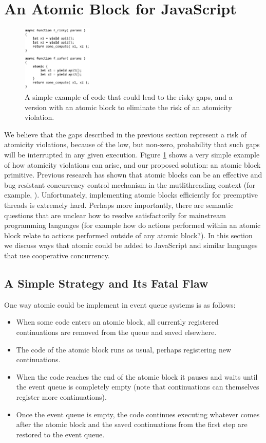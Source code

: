 \documentclass[sigplan,10pt,review,anonymous]{acmart}\settopmatter{printfolios=true,printccs=false,printacmref=false}
\begin{document}
\section{An Atomic Block for JavaScript}

\begin{figure}
\includegraphics[width=0.3\textwidth,left]{async_atomic_js}
\caption{A simple example of code that could lead to the risky gaps, and a version with an atomic block to eliminate the risk of an atomicity violation.}
\label{fig:async_atomic_js}
\end{figure}

We believe that the gaps described in the previous section represent a risk of atomicity violations, because of the low, but non-zero, probability that such gaps will be interrupted in any given execution.
Figure \ref{fig:async_atomic_js} shows a very simple example of how atomicity violations can arise, and our proposed solution: an atomic block primitive.
Previous research has shown that atomic blocks can be an effective and bug-resistant concurrency control mechanism in the mutlithreading context (for example, \cite{Harris2005, Grossman2007, Pankratius2014}).
Unfortunately, implementing atomic blocks efficiently for preemptive threads is extremely hard.
Perhaps more importantly, there are semantic questions that are unclear how to resolve satisfactorily for mainstream programming languages (for example how do actions performed within an atomic block relate to actions performed outside of any atomic block?).
In this section we discuss ways that atomic could be added to JavaScript and similar languages that use cooperative concurrency.

\subsection{A Simple Strategy and Its Fatal Flaw}

One way atomic could be implement in event queue systems is as follows:

\begin{itemize}
\item When some code enters an atomic block, all currently registered continuations are removed from the queue and saved elsewhere.
\item The code of the atomic block runs as usual, perhaps registering new continuations.
\item When the code reaches the end of the atomic block it pauses and waits until the event queue is completely empty (note that continuations can themselves register more continuations).
\item Once the event queue is empty, the code continues executing whatever comes after the atomic block and the saved continuations from the first step are restored to the event queue.
\end{itemize}
\end{document}
